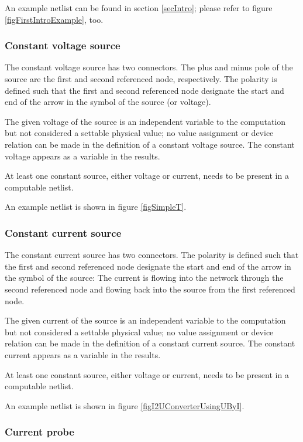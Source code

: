 An example netlist can be found in section \ref{secIntro}; please refer to figure
\ref{figFirstIntroExample}, too.


\subsubsection{Constant voltage source }

The constant voltage source  has two connectors. The plus and
minus pole of the source are the first and second referenced node,
respectively. The polarity is defined such that the first and second
referenced node designate the start and end of the arrow in the symbol of
the source (or voltage).

The given voltage of the source is an independent variable to the
computation but not considered a settable physical value; no value
assignment or device relation can be made in the definition of a constant
voltage source. The constant voltage appears as a variable in the
results.

At least one constant source, either voltage or current, needs to be
present in a computable netlist.

An example netlist is shown in figure \ref{figSimpleT}.


\subsubsection{Constant current source }

The constant current source  has two connectors. The polarity is
defined such that the first and second referenced node designate the start
and end of the arrow in the symbol of the source: The current is flowing
into the network through the second referenced node and flowing back into
the source from the first referenced node.

The given current of the source is an independent variable to the
computation but not considered a settable physical value; no value
assignment or device relation can be made in the definition of a constant
current source. The constant current appears as a variable in the results.

At least one constant source, either voltage or current, needs to be
present in a computable netlist.

An example netlist is shown in figure \ref{figI2UConverterUsingUByI}.


\subsubsection{Current probe }
\label{secSyntaxCurrentProbe}

